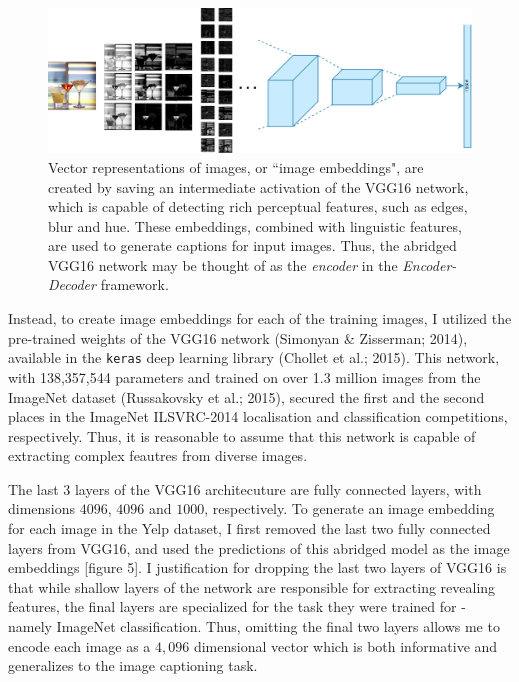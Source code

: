 \documentclass[letterpaper, 10 pt, conference]{ieeeconf}
\newcommand{\code}[1]{\colorbox{light-gray}{\texttt{#1}}}
\begin{document}
\begin{figure}[ht]
\centering
\includegraphics[width=1\linewidth]{cnn_features}
\caption{Vector representations of images, or ``image embeddings", are created by saving an intermediate activation of the VGG16 network, which is capable of detecting rich perceptual features, such as edges, blur and hue. These embeddings, combined with linguistic features, are used to generate captions for input images. Thus, the abridged VGG16 network may be thought of as the \emph{encoder} in the \emph{Encoder-Decoder} framework.}
\label{fig:test1}
\end{figure}

Instead, to create image embeddings for each of the training images, I utilized the pre-trained weights of the VGG16 network (Simonyan \& Zisserman; 2014), available in the \code{keras} deep learning library (Chollet et al.; 2015). This network, with 138,357,544 parameters and trained on over 1.3 million images from the ImageNet dataset (Russakovsky et al.; 2015), secured the first and the second places in the ImageNet ILSVRC-2014 localisation and classification competitions, respectively. Thus, it is reasonable to assume that this network is capable of extracting complex feautres from diverse images. 

The last 3 layers of the VGG16 architecuture are fully connected layers, with dimensions $4096$, $4096$ and $1000$, respectively. To generate an image embedding for each image in the Yelp dataset, I first removed the last two fully connected layers from VGG16, and used the predictions of this abridged model as  the image embeddings [figure 5]. I justification for dropping the last two layers of VGG16 is that while shallow layers of the network are responsible for extracting revealing features, the final layers are specialized for the task they were trained for - namely ImageNet classification. Thus, omitting the final two layers allows me to encode each image as a $4,096$ dimensional vector which is both informative and generalizes to the image captioning task.
\end{document}
